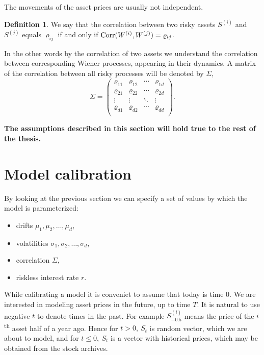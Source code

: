\documentclass[a4paper,11pt, twoside]{book}
\theoremstyle{definition}
\newtheorem{mydef}{Definition}[chapter]
\theoremstyle{remark}
\def\Corr{{\hbox{Corr}}}
\begin{document}
The movements of the asset prices are usually not independent.
\begin{mydef}
 We say that the correlation between two risky assets $S^{(i)}$ and $S^{(j)}$ equals $\varrho_{ij}$ if and only if $\Corr(W^{(i)}, W^{(j)}) = \varrho_{ij}$.
\end{mydef}
In the other words by the correlation of two assets we understand the correlation between corresponding Wiener processes, appearing in their dynamics. A matrix of the correlation between all risky processes will be denoted by $\Sigma$,
\begin{equation*}
 \Sigma = \left( \begin{array}{cccc}
           \varrho_{11} & \varrho_{12} & \cdots & \varrho_{1d} \\
           \varrho_{21} & \varrho_{22} & \cdots & \varrho_{2d} \\
           \vdots & \vdots & \ddots & \vdots \\
           \varrho_{d1} & \varrho_{d2} & \cdots & \varrho_{dd} \\
          \end{array} \right).
\end{equation*}

\textbf{The assumptions described in this section will hold true to the rest of the thesis.}

\section{Model calibration}
By looking at the previous section we can specify a set of values by which the model is parameterized:
\begin{itemize}
 \item drifts $\mu_1, \mu_2, \ldots, \mu_d$,
 \item volatilities $\sigma_1, \sigma_2, \ldots, \sigma_d$,
 \item correlation $\Sigma$,
 \item riskless interest rate $r$.
\end{itemize}
While calibrating a model it is conveniet to assume that today is time $0$. We are interested in modeling asset prices in the future, up to time $T$. It is natural to use negative $t$ to denote times in the past. For example $S^{(i)}_{-0.5}$ means the price of the $i$\textsuperscript{th} asset half of a year ago. Hence for $t > 0,\ S_t$ is random vector, which we are about to model, and for $t \leq 0,\ S_t$ is a vector with historical prices, which may be obtained from the stock archives.
\end{document}
